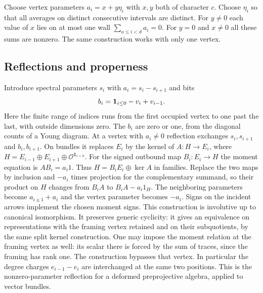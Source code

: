 Choose vertex parameters $a_i=x+y\eta_i$ with $x,y$ both of character $c$. Choose $\eta_i$ so that all averages on distinct consecutive intervals are distinct. For $y\ne0$ each value of $x$ lies on at most one wall $\sum_{a\le i<d}a_i=0$. For $y=0$ and $x\ne0$ all these sums are nonzero. The same construction works with only one vertex.

\subsection{Reflections and properness}

Introduce spectral parameters $s_i$ with $a_i=s_i-s_{i+1}$ and bits
\[
b_i={\bf1}_{i\le0}-v_i+v_{i-1}.
\]
Here the finite range of indices runs from the first occupied vertex to one past the last, with outside dimensions zero. The $b_i$ are zero or one, from the diagonal counts of a Young diagram. At a vertex with $a_i\ne0$ reflection exchanges $s_i,s_{i+1}$ and $b_i,b_{i+1}$. On bundles it replaces $E_i$ by the kernel of $A:H\to E_i$, where $H=E_{i-1}\oplus E_{i+1}\oplus\mathcal O^{\mathbf1_{i=0}}$. For the signed outbound map $B_i:E_i\to H$ the moment equation is $AB_i=a_i1$. Thus $H=B_iE_i\oplus\ker A$ in families. Replace the two maps by inclusion and $-a_i$ times projection for the complementary summand, so their product on $H$ changes from $B_i A$ to $B_i A-a_i1_H$. The neighboring parameters become $a_{i\pm1}+a_i$ and the vertex parameter becomes $-a_i$. Signs on the incident arrows implement the chosen moment signs. This construction is involutive up to canonical isomorphism. It preserves generic cyclicity: it gives an equivalence on representations with the framing vertex retained and on their subquotients, by the same split kernel construction. One may impose the moment relation at the framing vertex as well: its scalar there is forced by the sum of traces, since the framing has rank one. The construction bypasses that vertex. In particular the degree charges $e_{i-1}-e_i$ are interchanged at the same two positions. This is the nonzero-parameter reflection for a deformed preprojective algebra, applied to vector bundles.

